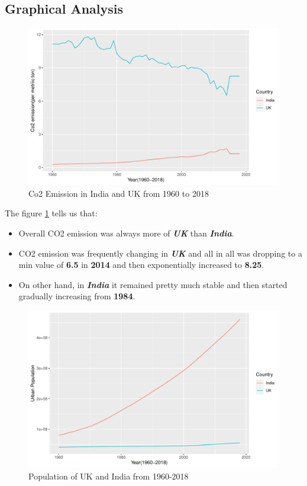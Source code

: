 \documentclass[11pt,a4paper,]{article}
\providecommand{\tightlist}{%
  \setlength{\itemsep}{0pt}\setlength{\parskip}{0pt}}
\begin{document}
\hypertarget{graphical-analysis}{%
\subsection{Graphical Analysis}\label{graphical-analysis}}

\begin{figure}

{\centering \includegraphics[width=0.9\linewidth]{Figures/co2-plt-1} 

}

\caption{Co2 Emission in India and UK from 1960 to 2018}\label{fig:co2-plt}
\end{figure}

The figure \ref{fig:co2-plt} tells us that:

\begin{itemize}
\tightlist
\item
  Overall CO2 emission was always more of \textbf{\emph{UK}} than \textbf{\emph{India}}.
\item
  CO2 emission was frequently changing in \textbf{\emph{UK}} and all in all was dropping to a min value of \textbf{6.5} in \textbf{2014} and then exponentially increased to \textbf{8.25}.
\item
  On other hand, in \textbf{\emph{India}} it remained pretty much stable and then started gradually increasing from \textbf{1984}.
\end{itemize}

\clearpage 
\begin{figure}

{\centering \includegraphics[width=0.9\linewidth]{Figures/popul-1} 

}

\caption{Population of UK and India from 1960-2018}\label{fig:popul}
\end{figure}
\end{document}
